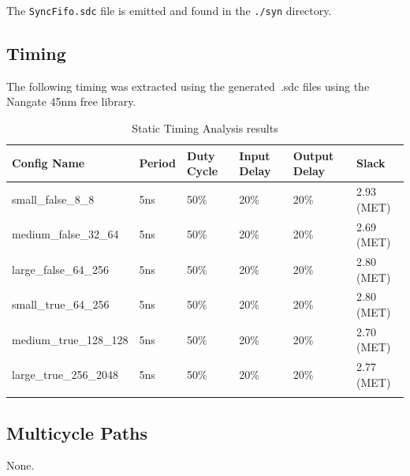 The \texttt{SyncFifo.sdc} file is emitted and found in the
\texttt{./syn} directory.

\subsection{Timing}

The following timing was extracted using the generated~.sdc files using the
Nangate 45nm free library.

\renewcommand*{\arraystretch}{1.4}
\begin{longtable}[H]{
    | p{}
    | p{}
    | p{}
    | p{}
    | p{}
    | p{} |
  }
  \hline
  \textbf{Config Name}   &
  \textbf{Period}        &
  \textbf{Duty Cycle}    &
  \textbf{Input Delay}   &
  \textbf{Output Delay}  &
  \textbf{Slack}           \\ \hline \hline

  small\_false\_8\_8     &
  5ns                    &
  50\%                   &
  20\%                   &
  20\%                   &
  2.93 (MET)               \\ \hline

  medium\_false\_32\_64  &
  5ns                    &
  50\%                   &
  20\%                   &
  20\%                   &
  2.69 (MET)               \\ \hline

  large\_false\_64\_256  &
  5ns                    &
  50\%                   &
  20\%                   &
  20\%                   &
  2.80 (MET)               \\ \hline

  small\_true\_64\_256   &
  5ns                    &
  50\%                   &
  20\%                   &
  20\%                   &
  2.80 (MET)               \\ \hline

  medium\_true\_128\_128 &
  5ns                    &
  50\%                   &
  20\%                   &
  20\%                   &
  2.70 (MET)               \\ \hline

  large\_true\_256\_2048 &
  5ns                    &
  50\%                   &
  20\%                   &
  20\%                   &
  2.77 (MET)               \\ \hline
  \caption{Static Timing Analysis results}\label{table:timing}
\end{longtable}

\subsection{Multicycle Paths}
None.
